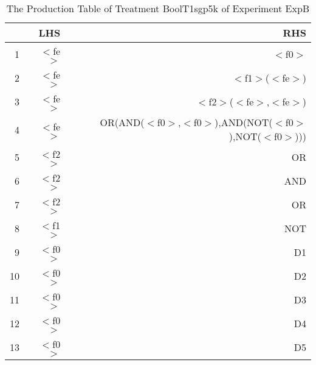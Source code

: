 \begin{table}[ht]
\centering
\begin{tabular}{rrr}
  \hline
 & LHS & RHS \\ 
  \hline
1 & $<$fe$>$ & $<$f0$>$ \\ 
  2 & $<$fe$>$ & $<$f1$>$($<$fe$>$) \\ 
  3 & $<$fe$>$ & $<$f2$>$($<$fe$>$,$<$fe$>$) \\ 
  4 & $<$fe$>$ & OR(AND($<$f0$>$,$<$f0$>$),AND(NOT($<$f0$>$),NOT($<$f0$>$))) \\ 
  5 & $<$f2$>$ & OR \\ 
  6 & $<$f2$>$ & AND \\ 
  7 & $<$f2$>$ & OR \\ 
  8 & $<$f1$>$ & NOT \\ 
  9 & $<$f0$>$ & D1 \\ 
  10 & $<$f0$>$ & D2 \\ 
  11 & $<$f0$>$ & D3 \\ 
  12 & $<$f0$>$ & D4 \\ 
  13 & $<$f0$>$ & D5 \\ 
   \hline
\end{tabular}
\caption{The Production Table of Treatment BoolT1sgp5k of Experiment ExpB} 
\end{table}
